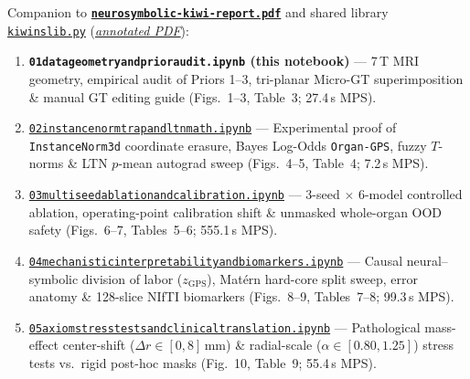 \documentclass[10pt,a4paper]{article}
\renewcommand{\_}{\origunderscore\allowbreak}
\newcommand{\ghblob}{https://github.com/arvidl/BMED365-2027/blob/main}
\newcommand{\repodir}{Lab4-Comp-Imag/Kiwi-challenge/docs/neurosymbolic-report}
\begin{document}
\begin{seqbox}
{\footnotesize Companion to \href{\ghblob/\repodir/neurosymbolic-kiwi-report.pdf}{\textbf{\texttt{neurosymbolic-kiwi-report.pdf}}} and shared library \href{\ghblob/\repodir/notebooks/kiwi_ns_lib.py}{\texttt{kiwi\_ns\_lib.py}} (\href{\ghblob/\repodir/notebooks/kiwi_ns_lib_py.pdf}{\textit{annotated PDF}}):}
\begin{enumerate}[start=1, itemsep=1.2pt, topsep=2pt, font=\footnotesize]
    \item \textbf{\texttt{01\_data\_geometry\_and\_prior\_audit.ipynb} (this notebook)} --- 7\,T MRI geometry, empirical audit of Priors 1--3, tri-planar Micro-GT superimposition \& manual GT editing guide (Figs.\ 1--3, Table~3; 27.4\,s MPS).
    \item \href{\ghblob/\repodir/notebooks/02_instancenorm_trap_and_ltn_math.ipynb}{\texttt{02\_instancenorm\_trap\_and\_ltn\_math.ipynb}} --- Experimental proof of \texttt{InstanceNorm3d} coordinate erasure, Bayes Log-Odds \texttt{Organ-GPS}, fuzzy $T$-norms \& LTN $p$-mean autograd sweep (Figs.\ 4--5, Table~4; 7.2\,s MPS).
    \item \href{\ghblob/\repodir/notebooks/03_multiseed_ablation_and_calibration.ipynb}{\texttt{03\_multiseed\_ablation\_and\_calibration.ipynb}} --- 3-seed $\times$ 6-model controlled ablation, operating-point calibration shift \& unmasked whole-organ OOD safety (Figs.\ 6--7, Tables~5--6; 555.1\,s MPS).
    \item \href{\ghblob/\repodir/notebooks/04_mechanistic_interpretability_and_biomarkers.ipynb}{\texttt{04\_mechanistic\_interpretability\_and\_biomarkers.ipynb}} --- Causal neural--symbolic division of labor ($z_{\text{GPS}}$), Mat\'ern hard-core split sweep, error anatomy \& 128-slice NIfTI biomarkers (Figs.\ 8--9, Tables~7--8; 99.3\,s MPS).
    \item \href{\ghblob/\repodir/notebooks/05_axiom_stress_tests_and_clinical_translation.ipynb}{\texttt{05\_axiom\_stress\_tests\_and\_clinical\_translation.ipynb}} --- Pathological mass-effect center-shift ($\Delta r \in [0, 8]$\,mm) \& radial-scale ($\alpha \in [0.80, 1.25]$) stress tests vs.\ rigid post-hoc masks (Fig.\ 10, Table~9; 55.4\,s MPS).
\end{enumerate}
\end{seqbox}
\end{document}
